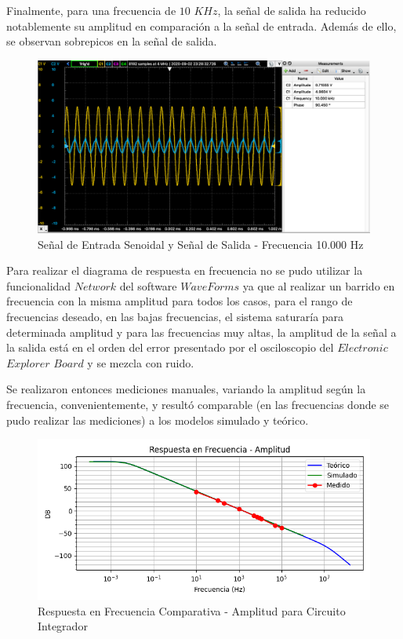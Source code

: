 Finalmente, para una frecuencia de $10$ $KHz$, la señal de salida ha reducido notablemente su amplitud en comparación a la señal de entrada.
Además de ello, se observan sobrepicos en la señal de salida.

\begin{figure}[H]
    \centering 
    \includegraphics [scale=0.4] {../Ejercicio3-CircuitoIntegradoresyDerivadores/Imagenes/senoidal - 10000.png} 
    \caption{Señal de Entrada Senoidal y Señal de Salida - Frecuencia 10.000 Hz}
    \label{fig:emptyPlotTool}
\end{figure}

Para realizar el diagrama de respuesta en frecuencia no se pudo utilizar la funcionalidad $Network$ del software $WaveForms$ ya que al realizar un barrido en frecuencia
con la misma amplitud para todos los casos, para el rango de frecuencias deseado, en las bajas frecuencias, el sistema saturaría para determinada amplitud y para las frecuencias muy altas, la amplitud de la señal a la salida
está en el orden del error presentado por el osciloscopio del $Electronic$ $Explorer$ $Board$ y se mezcla con ruido.

Se realizaron entonces mediciones manuales, variando la amplitud según la frecuencia, convenientemente, y resultó comparable (en las frecuencias donde se pudo realizar las mediciones)
a los modelos simulado y teórico.

\begin{figure}[H]
    \centering 
    \includegraphics [scale=1] {../Ejercicio3-CircuitoIntegradoresyDerivadores/Imagenes/comparativo-integrador-amplitud.png} 
    \caption{Respuesta en Frecuencia Comparativa - Amplitud para Circuito Integrador }
    \label{fig:emptyPlotTool}
\end{figure}


